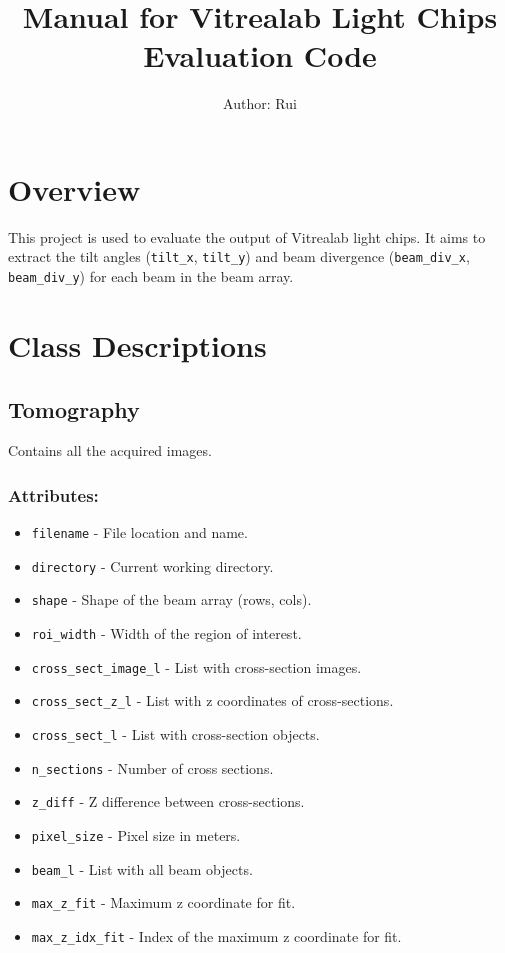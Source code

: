 \documentclass{article}
\title{Manual for Vitrealab Light Chips Evaluation Code}
\author{Author: Rui}
\date{}
\begin{document}
\maketitle

\section*{Overview}
This project is used to evaluate the output of Vitrealab light chips. It aims to extract the tilt angles (\texttt{tilt\_x}, \texttt{tilt\_y}) and beam divergence (\texttt{beam\_div\_x}, \texttt{beam\_div\_y}) for each beam in the beam array.

\section{Class Descriptions}

\subsection{Tomography}
Contains all the acquired images.
\subsubsection*{Attributes:}
\begin{itemize}
    \item \texttt{filename} - File location and name.
    \item \texttt{directory} - Current working directory.
    \item \texttt{shape} - Shape of the beam array (rows, cols).
    \item \texttt{roi\_width} - Width of the region of interest.
    \item \texttt{cross\_sect\_image\_l} - List with cross-section images.
    \item \texttt{cross\_sect\_z\_l} - List with z coordinates of cross-sections.
    \item \texttt{cross\_sect\_l} - List with cross-section objects.
    \item \texttt{n\_sections} - Number of cross sections.
    \item \texttt{z\_diff} - Z difference between cross-sections.
    \item \texttt{pixel\_size} - Pixel size in meters.
    \item \texttt{beam\_l} - List with all beam objects.
    \item \texttt{max\_z\_fit} - Maximum z coordinate for fit.
    \item \texttt{max\_z\_idx\_fit} - Index of the maximum z coordinate for fit.
\end{itemize}
\end{document}
